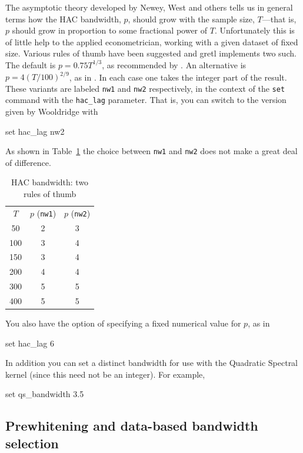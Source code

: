 The asymptotic theory developed by Newey, West and others tells us in
general terms how the HAC bandwidth, $p$, should grow with the sample
size, $T$---that is, $p$ should grow in proportion to some
fractional power of $T$.  Unfortunately this is of little help to the
applied econometrician, working with a given dataset of fixed size.
Various rules of thumb have been suggested and gretl implements
two such.  The default is $p = 0.75 T^{1/3}$, as recommended by
\cite{stock-watson03}.  An alternative is $p = 4(T/100)^{2/9}$, as in
\cite{wooldridge-intro}.  In each case one takes the integer part of the
result.  These variants are labeled \texttt{nw1} and \texttt{nw2}
respectively, in the context of the \texttt{set} command with the
\verb|hac_lag| parameter.  That is, you can switch to the version
given by Wooldridge with
%
\begin{code}
set hac_lag nw2
\end{code}
%
As shown in Table~\ref{tab:haclag} the choice between \texttt{nw1} and
\texttt{nw2} does not make a great deal of difference.

\begin{table}[htbp]
  \centering
  \begin{tabular}{ccc}
    $T$ & $p$ (\texttt{nw1}) & $p$ (\texttt{nw2}) \\[4pt]
50& 	2& 	3 \\
100& 	3& 	4 \\
150& 	3& 	4 \\
200& 	4& 	4 \\
300& 	5& 	5 \\
400& 	5& 	5 \\
  \end{tabular}
\caption{HAC bandwidth: two rules of thumb}
\label{tab:haclag}
\end{table}

You also have the option of specifying a fixed numerical value for
$p$, as in

\begin{code}
set hac_lag 6
\end{code}

In addition you can set a distinct bandwidth for use with the
Quadratic Spectral kernel (since this need not be an integer).  For
example,
%
\begin{code}
set qs_bandwidth 3.5
\end{code}

\subsection{Prewhitening and data-based bandwidth selection}
\label{sec:hac-prewhiten}

